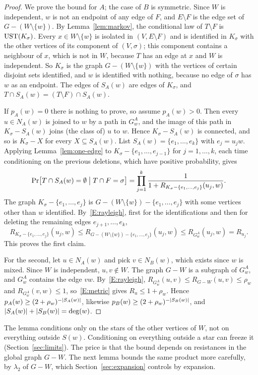 \begin{proof}
We prove the bound for $A$; the case of $B$ is symmetric. Since $W$ is independent, $w$ is not an endpoint of any edge of $F$, and $E\setminus F$ is the edge set of $G-(W\setminus\{w\})$. By Lemma~\ref{lem:markov}, the conditional law of $T\setminus F$ is $\mathrm{UST}(K_\sigma)$. Every $x\in W\setminus\{w\}$ is isolated in $(V,E\setminus F)$ and is identified in $K_\sigma$ with the other vertices of its component of $(V,\sigma)$; this component contains a neighbour of $x$, which is not in $W$, because $T$ has an edge at $x$ and $W$ is independent. So $K_\sigma$ is the graph $G-(W\setminus\{w\})$ with the vertices of certain disjoint sets identified, and $w$ is identified with nothing, because no edge of $\sigma$ has $w$ as an endpoint. The edges of $S_A(w)$ are edges of $K_\sigma$, and $T\cap S_A(w)=(T\setminus F)\cap S_A(w)$.

If $p_A(w)=0$ there is nothing to prove, so assume $p_A(w)>0$. Then every $u\in N_A(w)$ is joined to $w$ by a path in $G_w^A$, and the image of this path in $K_\sigma-S_A(w)$ joins (the class of) $u$ to $w$. Hence $K_\sigma-S_A(w)$ is connected, and so is $K_\sigma-X$ for every $X\subseteq S_A(w)$. List $S_A(w)=\{e_1,\dots,e_k\}$ with $e_j=u_jw$. Applying Lemma~\ref{lem:one-edge} to $K_\sigma-\{e_1,\dots,e_{j-1}\}$ for $j=1,\dots,k$, each time conditioning on the previous deletions, which have positive probability, gives
\[
  \Pr\bigl[T\cap S_A(w)=\emptyset\bigm|T\cap F=\sigma\bigr]=\prod_{j=1}^k\frac1{1+R_{K_\sigma-\{e_1,\dots,e_j\}}(u_j,w)} .
\]
The graph $K_\sigma-\{e_1,\dots,e_j\}$ is $G-(W\setminus\{w\})-\{e_1,\dots,e_j\}$ with some vertices other than $w$ identified. By~\ref{E:rayleigh}, first for the identifications and then for deleting the remaining edges $e_{j+1},\dots,e_k$,
\[
  R_{K_\sigma-\{e_1,\dots,e_j\}}(u_j,w)\le R_{G-(W\setminus\{w\})-\{e_1,\dots,e_j\}}(u_j,w)\le R_{G_w^A}(u_j,w)=R_{u_j}.
\]
This proves the first claim.

For the second, let $u\in N_A(w)$ and pick $v\in N_B(w)$, which exists since $w$ is mixed. Since $W$ is independent, $u,v\notin W$. The graph $G-W$ is a subgraph of $G_w^A$, and $G_w^A$ contains the edge $vw$. By~\ref{E:rayleigh}, $R_{G_w^A}(u,v)\le R_{G-W}(u,v)\le\rho_w$ and $R_{G_w^A}(v,w)\le1$, so~\ref{E:metric} gives $R_u\le1+\rho_w$. Hence $p_A(w)\ge(2+\rho_w)^{-\lvert S_A(w)\rvert}$, likewise $p_B(w)\ge(2+\rho_w)^{-\lvert S_B(w)\rvert}$, and $\lvert S_A(w)\rvert+\lvert S_B(w)\rvert=\deg(w)$.
\end{proof}

The lemma conditions only on the stars of the other vertices of $W$, not on everything outside $S(w)$. Conditioning on everything outside a star can freeze it (Section~\ref{sec:limits}). The price is that the bound depends on resistances in the global graph $G-W$. The next lemma bounds the same product more carefully, by $\lambda_2$ of $G-W$, which Section~\ref{sec:expansion} controls by expansion.


